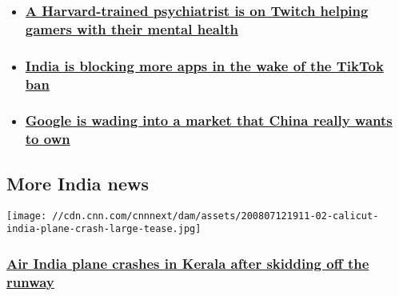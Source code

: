 \begin{itemize}
\item
  \hypertarget{a-harvard-trained-psychiatrist-is-on-twitch-helping-gamers-with-their-mental-health}{%
  \subsubsection{\texorpdfstring{\href{/2020/08/05/tech/dr-k-healthy-gamer-gg-twitch-wellness/index.html}{A
  Harvard-trained psychiatrist is on Twitch helping gamers with their
  mental
  health}}{A Harvard-trained psychiatrist is on Twitch helping gamers with their mental health}}\label{a-harvard-trained-psychiatrist-is-on-twitch-helping-gamers-with-their-mental-health}}
\item
  \hypertarget{india-is-blocking-more-apps-in-the-wake-of-the-tiktok-ban}{%
  \subsubsection{\texorpdfstring{\href{/2020/07/28/tech/india-china-apps-ban-hnk-intl/index.html}{India
  is blocking more apps in the wake of the TikTok
  ban}}{India is blocking more apps in the wake of the TikTok ban}}\label{india-is-blocking-more-apps-in-the-wake-of-the-tiktok-ban}}
\item
  \hypertarget{google-is-wading-into-a-market-that-china-really-wants-to-own}{%
  \subsubsection{\texorpdfstring{\href{/2020/07/24/tech/jio-google-india-china-hnk-intl/index.html}{Google
  is wading into a market that China really wants to
  own}}{Google is wading into a market that China really wants to own}}\label{google-is-wading-into-a-market-that-china-really-wants-to-own}}
\end{itemize}

\hypertarget{more-india-news}{%
\subsection{More India news}\label{more-india-news}}

\href{/2020/08/07/asia/plane-crash-calicut-india-intl/index.html}{}

\texttt{[image: //cdn.cnn.com/cnnnext/dam/assets/200807121911-02-calicut-india-plane-crash-large-tease.jpg]}

\hypertarget{air-india-plane-crashes-in-kerala-after-skidding-off-the-runway}{%
\subsubsection{\texorpdfstring{\href{/2020/08/07/asia/plane-crash-calicut-india-intl/index.html}{Air
India plane crashes in Kerala after skidding off the
runway}}{Air India plane crashes in Kerala after skidding off the runway}}\label{air-india-plane-crashes-in-kerala-after-skidding-off-the-runway}}

